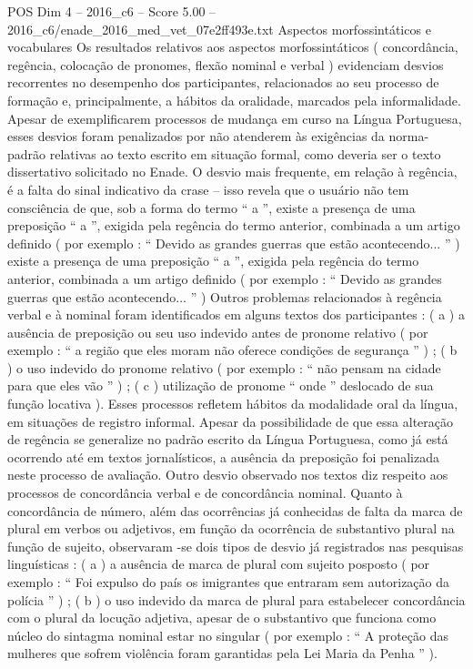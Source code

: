 \begin{textsample}{POS Dim 4 – 2016\_c6 – Score 5.00 – 2016\_c6/enade\_2016\_med\_vet\_07e2ff493e.txt}
Aspectos morfossintáticos e vocabulares Os resultados relativos aos aspectos morfossintáticos ( concordância, regência, colocação de pronomes, flexão nominal e verbal ) evidenciam desvios recorrentes no desempenho dos participantes, relacionados ao seu processo de formação e, principalmente, a hábitos da oralidade, marcados pela informalidade.
Apesar de exemplificarem processos de mudança em curso na Língua Portuguesa, esses desvios foram penalizados por não atenderem às exigências da norma-padrão relativas ao texto escrito em situação formal, como deveria ser o texto dissertativo solicitado no Enade.
O desvio mais frequente, em relação à regência, é a falta do sinal indicativo da crase – isso revela que o usuário não tem consciência de que, sob a forma do termo “ a ”, existe a presença de uma preposição “ a ”, exigida pela regência do termo anterior, combinada a um artigo definido ( por exemplo : “ Devido as grandes guerras que estão acontecendo... ” ) existe a presença de uma preposição “ a ”, exigida pela regência do termo anterior, combinada a um artigo definido ( por exemplo : “ Devido as grandes guerras que estão acontecendo... ” ) Outros problemas relacionados à regência verbal e à nominal foram identificados em alguns textos dos participantes : ( a ) a ausência de preposição ou seu uso indevido antes de pronome relativo ( por exemplo : “ a região que eles moram não oferece condições de segurança ” ) ; ( b ) o uso indevido do pronome relativo ( por exemplo : “ não pensam na cidade para que eles vão ” ) ; ( c ) utilização de pronome “ onde ” deslocado de sua função locativa ).
Esses processos refletem hábitos da modalidade oral da língua, em situações de registro informal.
Apesar da possibilidade de que essa alteração de regência se generalize no padrão escrito da Língua Portuguesa, como já está ocorrendo até em textos jornalísticos, a ausência da preposição foi penalizada neste processo de avaliação.
Outro desvio observado nos textos diz respeito aos processos de concordância verbal e de concordância nominal.
Quanto à concordância de número, além das ocorrências já conhecidas de falta da marca de plural em verbos ou adjetivos, em função da ocorrência de substantivo plural na função de sujeito, observaram -se dois tipos de desvio já registrados nas pesquisas linguísticas : ( a ) a ausência de marca de plural com sujeito posposto ( por exemplo : “ Foi expulso do país os imigrantes que entraram sem autorização da polícia ” ) ; ( b ) o uso indevido da marca de plural para estabelecer concordância com o plural da locução adjetiva, apesar de o substantivo que funciona como núcleo do sintagma nominal estar no singular ( por exemplo : “ A proteção das mulheres que sofrem violência foram garantidas pela Lei Maria da Penha ” ).

\end{textsample}
